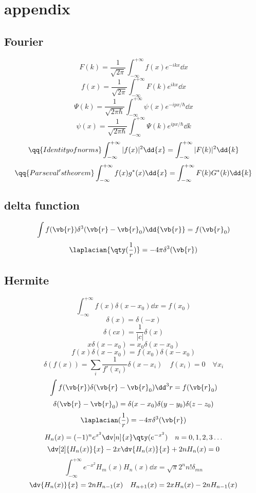 \section*{appendix}

\subsection*{Fourier}
\[F(k)=\frac{1}{\sqrt{2\pi}}\int_{-\infty}^{+\infty}f(x)e^{-ikx}\dd{x}\]
\[f(x)=\frac{1}{\sqrt{2\pi}}\int_{-\infty}^{+\infty}F(k)e^{ikx}\dd{x}\]
\[\Psi(k)=\frac{1}{\sqrt{2\pi\hbar}}\int_{-\infty}^{+\infty}\psi(x)e^{-ipx/\hbar}\dd{x}\]
\[\psi(x)=\frac{1}{\sqrt{2\pi\hbar}}\int_{-\infty}^{+\infty}\Psi(k)e^{ipx/\hbar}\dd{k}\]
\[\qq{Identity of norms} \int_{-\infty}^{+\infty}|f(x)|^2\dd{x}=\int_{-\infty}^{+\infty}|F(k)|^2\dd{k}\]
\[\qq{Parseval's theorem} \int_{-\infty}^{+\infty}f(x)g^*(x)\dd{x}=\int_{-\infty}^{+\infty}F(k)G^*(k)\dd{k}\]
\subsection*{delta function}
\[\int f(\vb{r})\delta^3(\vb{r}-\vb{r}_0)\dd{\vb{r}}=f(\vb{r}_0)\]
\[\laplacian{\qty(\frac{1}{r})}=-4\pi\delta^3(\vb{r})\]
\subsection*{Hermite}

\[\int_{-\infty}^{+\infty}f(x)\delta(x-x_0)\dd{x}=f(x_0)\]
\[\delta(x)=\delta(-x)\]
\[\delta(cx)=\frac{1}{|c|}\delta(x)\]
\[x\delta(x-x_0)=x_0\delta(x-x_0)\]
\[f(x)\delta(x-x_0)=f(x_0)\delta(x-x_0)\]
\[\delta(f(x))=\sum_{i}\frac{1}{f'(x_i)}\delta(x-x_i)\quad f(x_i)=0\quad\forall{x_i}\]
\[\int f(\vb{r})\delta(\vb{r}-\vb{r}_0)\dd^3{r}=f(\vb{r}_0)\]
\[\delta(\vb{r}-\vb{r}_0)=\delta(x-x_0)\delta(y-y_0)\delta(z-z_0)\]
\[\laplacian(\frac{1}{r})=-4\pi\delta^3(\vb{r})\]
\[H_n(x)=(-1)^ne^{x^2}\dv[n]{x}\qty(e^{-x^2})\quad n=0,1,2,3\ldots\]
\[\dv[2]{H_n(x)}{x}-2x\dv{H_n(x)}{x}+2nH_n(x)=0\]
\[\int_{-\infty}^{+\infty}e^{-x^2}H_m(x)H_n(x)\dd{x}=\sqrt{\pi}2^nn!\delta_{mn}\]
\[\dv{H_n(x)}{x}=2nH_{n-1}(x)\quad H_{n+1}(x)=2xH_n(x)-2nH_{n-1}(x)\]
